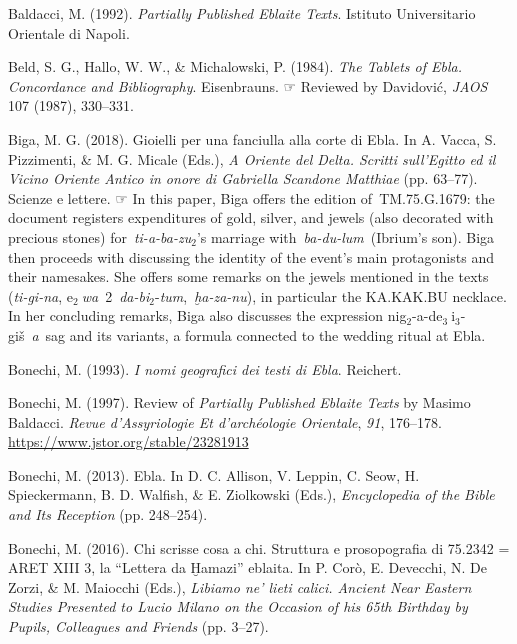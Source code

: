 \documentclass[
]{book}
\newlength{\cslhangindent}
\newlength{\cslentryspacingunit} %
\newenvironment{CSLReferences}[2] %
 {%
  \setlength{\parindent}{0pt}
  \ifodd #1
  \let\oldpar\par
  \def\par{\hangindent=\cslhangindent\oldpar}
  \fi
  \setlength{\parskip}{#2\cslentryspacingunit}
 }%
 {}
\newcommand{\CSLBlock}[1]{#1\hfill\break}
\begin{document}
\begin{CSLReferences}{1}{0}
\leavevmode{}%
Baldacci, M. (1992). \emph{Partially {Published Eblaite Texts}}. Istituto Universitario Orientale di Napoli.

\leavevmode{}%
Beld, S. G., Hallo, W. W., \& Michalowski, P. (1984). \emph{The {Tablets} of {Ebla}. {Concordance} and {Bibliography}}. Eisenbrauns.
\CSLBlock{\newline☞ Reviewed by Davidovi{ć}, \emph{JAOS} 107 (1987), 330--331.}

\leavevmode{}%
Biga, M. G. (2018). {Gioielli per una fanciulla alla corte di Ebla}. In A. Vacca, S. Pizzimenti, \& M. G. Micale (Eds.), \emph{{A Oriente del Delta. Scritti sull'Egitto ed il Vicino Oriente Antico in onore di Gabriella Scandone Matthiae}} (pp. 63--77). Scienze e lettere.
\CSLBlock{\newline☞ In this paper, Biga offers the edition of~TM.75.G.1679: the document registers expenditures of gold, silver, and jewels (also decorated with precious stones) for~\emph{ti-a-ba-zu}{\(_2\)}'s marriage with~\emph{ba-du-lum}~(Ibrium's son). Biga then proceeds with discussing the identity of the event's main protagonists and their namesakes. She offers some remarks on the jewels mentioned in the texts (\emph{ti-gi-na}, e{\(_{2}~\)}\emph{wa}~2~\emph{da-bi}{\(_2\)}-\emph{tum},~\emph{ḫa-za-nu}), in particular the KA.KAK.BU necklace. In her concluding remarks, Biga also discusses the expression nig{\(_2\)}-a-de{\(_{3}~\)}i{\(_3\)}-gi{š}~\emph{a}~sag and its variants, a formula connected to the wedding ritual at Ebla.}

\leavevmode{}%
Bonechi, M. (1993). \emph{{I nomi geografici dei testi di Ebla}}. Reichert.

\leavevmode{}%
Bonechi, M. (1997). Review of {\emph{Partially Published Eblaite Texts}} by {Masimo Baldacci}. \emph{Revue d'Assyriologie Et d'arch{é}ologie Orientale}, \emph{91}, 176--178. \url{https://www.jstor.org/stable/23281913}

\leavevmode{}%
Bonechi, M. (2013). Ebla. In D. C. Allison, V. Leppin, C. Seow, H. Spieckermann, B. D. Walfish, \& E. Ziolkowski (Eds.), \emph{Encyclopedia of the {Bible} and {Its Reception}} (pp. 248--254).

\leavevmode{}%
Bonechi, M. (2016). {Chi scrisse cosa a chi. Struttura e prosopografia di 75.2342 = ARET XIII 3, la {``Lettera da Ḫamazi''} eblaita}. In P. Corò, E. Devecchi, N. De Zorzi, \& M. Maiocchi (Eds.), \emph{{Libiamo ne' lieti calici. Ancient Near Eastern Studies Presented to Lucio Milano on the Occasion of his 65th Birthday by Pupils, Colleagues and Friends}} (pp. 3--27).


\end{CSLReferences}
\end{document}
